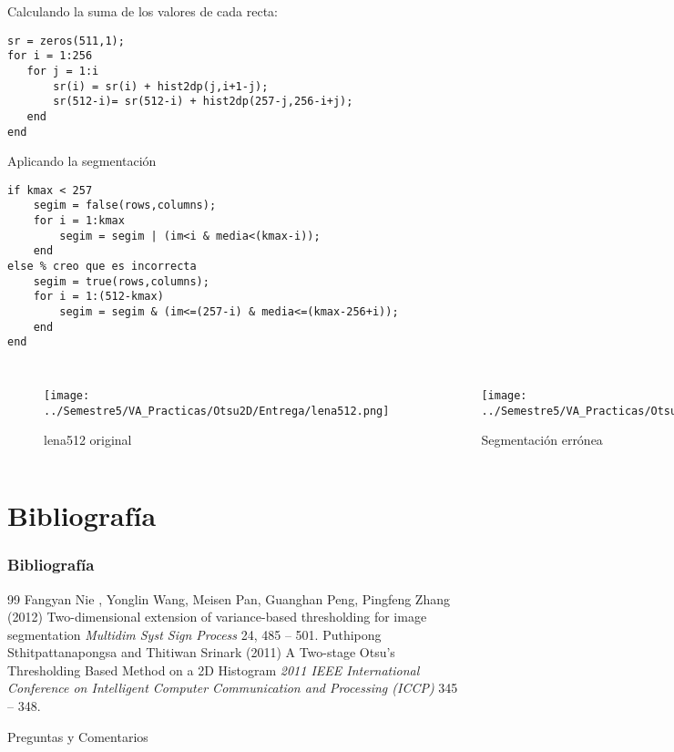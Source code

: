 \documentclass{beamer}
\begin{document}
\begin{frame}[fragile]
Calculando la suma de los valores de cada recta:
\begin{lstlisting}
sr = zeros(511,1);
for i = 1:256
   for j = 1:i
       sr(i) = sr(i) + hist2dp(j,i+1-j);
       sr(512-i)= sr(512-i) + hist2dp(257-j,256-i+j);
   end
end  
\end{lstlisting}

\end{frame}

\begin{frame}[fragile]
Aplicando la segmentación
\begin{lstlisting}
if kmax < 257
    segim = false(rows,columns);
    for i = 1:kmax
        segim = segim | (im<i & media<(kmax-i));
    end
else % creo que es incorrecta
    segim = true(rows,columns);
    for i = 1:(512-kmax)
        segim = segim & (im<=(257-i) & media<=(kmax-256+i));
    end
end
\end{lstlisting}

\end{frame}

\begin{frame}
\begin{columns}[t]
\begin{figure}
\texttt{[image: ../Semestre5/VA\_Practicas/Otsu2D/Entrega/lena512.png]}
\caption{lena512 original}
\end{figure}

\begin{figure}
\texttt{[image: ../Semestre5/VA\_Practicas/Otsu2D/Entrega/seg\_lena512.png]}
\caption{Segmentación errónea}
\end{figure}

\end{columns}
\end{frame}

\section{Bibliografía}
\begin{frame}
\frametitle{Bibliografía}
\footnotesize{
\begin{thebibliography}{99} %
 Fangyan Nie , Yonglin Wang, Meisen Pan, Guanghan Peng, Pingfeng Zhang (2012)
\newblock Two-dimensional extension of variance-based thresholding for image segmentation
\newblock \emph{Multidim Syst Sign Process} 24, 485 -- 501.
 Puthipong Sthitpattanapongsa and Thitiwan Srinark (2011)
\newblock A Two-stage Otsu’s Thresholding Based Method on a 2D Histogram
\newblock \emph{2011 IEEE International Conference on Intelligent Computer Communication and Processing (ICCP)}  345 -- 348.
\end{thebibliography}
}
\end{frame}


\begin{frame}
\Huge{\centerline{Preguntas y Comentarios}}
\end{frame}

\end{document}
